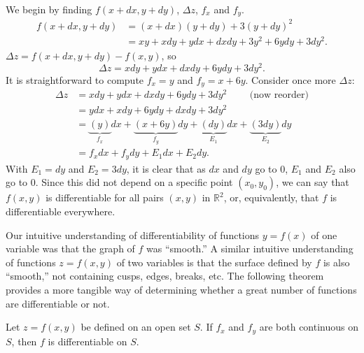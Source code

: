 {We begin by finding $f(x+dx,y+dy)$, $\Delta z$, $f_x$ and $f_y$.
\begin{align*}
f(x+dx,y+dy) &= (x+dx)(y+dy) + 3(y+dy)^2 \\
						&= xy + xdy+ydx+dxdy + 3y^2+6ydy+3dy^2.
\end{align*}
$\Delta z = f(x+dx,y+dy) - f(x,y)$, so
\[\Delta z = xdy + ydx + dxdy + 6ydy+3dy^2.\]
It is straightforward to compute $f_x = y$ and $f_y = x+6y$. Consider once more $\Delta z$:
\begin{align*}
\Delta z &= xdy + ydx + dxdy + 6ydy+3dy^2 \qquad \text{ (now reorder)}\\
		&= ydx + xdy+6ydy+ dxdy + 3dy^2\\
		&= \underbrace{(y)}_{f_x}dx + \underbrace{(x+6y)}_{f_y}dy + \underbrace{(dy)}_{E_1}dx+\underbrace{(3dy)}_{E_2}dy\\
		&= f_xdx + f_ydy + E_1dx+E_2dy.
\end{align*}
With $E_1 = dy$ and $E_2 = 3dy$, it is clear that as $dx$ and $dy$ go to 0, $E_1$ and $E_2$ also go to 0. Since this did not depend on a specific point $(x_0,y_0)$, we can say that $f(x,y)$ is differentiable for all pairs $(x,y)$ in $\mathbb{R}^2$, or, equivalently, that $f$ is differentiable everywhere. }

Our intuitive understanding of differentiability of functions $y=f(x)$ of one variable was that the graph of $f$ was ``smooth.'' A similar intuitive understanding of functions $z=f(x,y)$ of two variables is that the surface defined by $f$ is also ``smooth,'' not containing cusps, edges, breaks,  etc. The following theorem
provides a more tangible way of determining whether a great number of functions are differentiable or not.


{Let $z=f(x,y)$ be defined on an open set $S$. If $f_x$ and $f_y$ are both continuous on $S$, then $f$ is differentiable on $S$.
}


